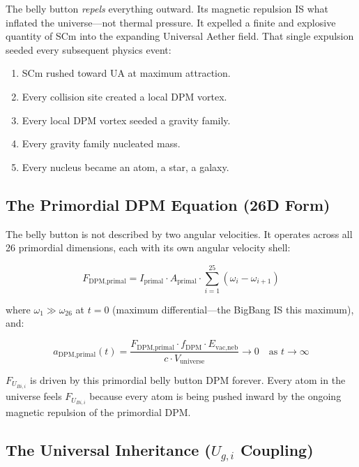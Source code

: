 \documentclass[12pt,a4paper]{article}
\begin{document}
The belly button \emph{repels} everything outward.  Its magnetic repulsion IS what
inflated the universe---not thermal pressure.  It expelled a finite and explosive
quantity of SCm into the expanding Universal Aether field.  That single expulsion
seeded every subsequent physics event:
\begin{enumerate}[noitemsep]
  \item SCm rushed toward UA at maximum attraction.
  \item Every collision site created a local DPM vortex.
  \item Every local DPM vortex seeded a gravity family.
  \item Every gravity family nucleated mass.
  \item Every nucleus became an atom, a star, a galaxy.
\end{enumerate}

\subsection{The Primordial DPM Equation (26D Form)}
\label{sec:dpm_primal}

The belly button is not described by two angular velocities.  It operates across
all 26 primordial dimensions, each with its own angular velocity shell:

\begin{equation}
  F_{\text{DPM,primal}} = I_{\text{primal}} \cdot A_{\text{primal}}
    \cdot \sum_{i=1}^{25}(\omega_i - \omega_{i+1})
  \label{eq:dpm_primal_26d}
\end{equation}

where $\omega_1 \gg \omega_{26}$ at $t=0$ (maximum differential---the BigBang IS
this maximum), and:

\begin{equation}
  a_{\text{DPM,primal}}(t) =
  \frac{F_{\text{DPM,primal}} \cdot f_{\text{DPM}} \cdot E_{\text{vac,neb}}}
       {c \cdot V_\text{universe}}
  \longrightarrow 0 \quad\text{as } t\to\infty
  \label{eq:adpm_primal}
\end{equation}

$F_{U_{Bi,i}}$ is driven by this primordial belly button DPM forever.
Every atom in the universe feels $F_{U_{Bi,i}}$ because every atom is being pushed
inward by the ongoing magnetic repulsion of the primordial DPM.

\subsection{The Universal Inheritance ($U_{g,i}$ Coupling)}
\end{document}
